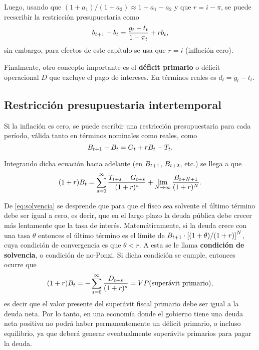 \documentclass[DeGregorioResumen]{subfiles}
\begin{document}
Luego, usando que $(1+a_1)/(1+a_2) \approx 1+a_1-a_2 $ y que $r=i-\pi $, se puede reescribir la restricción presupuestaria como
\begin{equation}
{b}_{t+1}-b_t = \frac{g_t-t_t}{1+\pi_t}+rb_t,
\end{equation}
sin embargo, para efectos de este capítulo se usa que $r=i$ (inflación cero).

Finalmente, otro concepto importante es el \textbf{déficit primario} o déficit operacional $D$ que excluye el pago de intereses. En términos reales es $d_t = g_t-t_t$.

\subsection{Restricción presupuestaria intertemporal}

Si la inflación es cero, se puede escribir una restricción presupuestaria para cada período, válida tanto en términos nominales como reales, como
\begin{equation}
{B}_{t+1}-B_t = G_t + rB_t - T_t.
\end{equation}

Integrando dicha ecuación hacia adelante (en ${B}_{t+1}$, ${B}_{t+2}$, etc.) se llega a que
\begin{equation}
(1+r)B_t = \sum_{s=0}^{\infty}{\frac{{T}_{t+s}-{G}_{t+s}}{(1+r)^s}+\lim_{N\rightarrow\infty}{\frac{{B}_{t+N+1}}{(1+r)^N}}}.
\label{eq:solvencia}
\end{equation}

De \eqref{eq:solvencia} se desprende que para que el fisco sea solvente el último término debe ser igual a cero, es decir, que en el largo plazo la deuda pública debe crecer más lentamente que la tasa de interés. Matemáticamente, si la deuda crece con una tasa $\theta $ entonces el último término es el límite de ${B}_{t+1}\cdot\left[(1+\theta)/(1+r)\right]^N$, cuya condición de convergencia es que $\theta < r$. A esta se le llama \textbf{condición de solvencia}, o condición de no-Ponzi. Si dicha condición se cumple, entonces ocurre que
\begin{equation}
(1+r)B_t = -\sum_{s=0}^{\infty}{\frac{{D}_{t+s}}{(1+r)^s}} = VP(\text{superávit primario}),
\label{eq:restriccion_superavit_primario}
\end{equation}
es decir que el valor presente del superávit fiscal primario debe ser igual a la deuda neta. Por lo tanto, en una economía donde el gobierno tiene una deuda neta positiva no podrá haber permanentemente un déficit primario, o incluso equilibrio, ya que deberá generar eventualmente superávits primarios para pagar la deuda.
\end{document}
